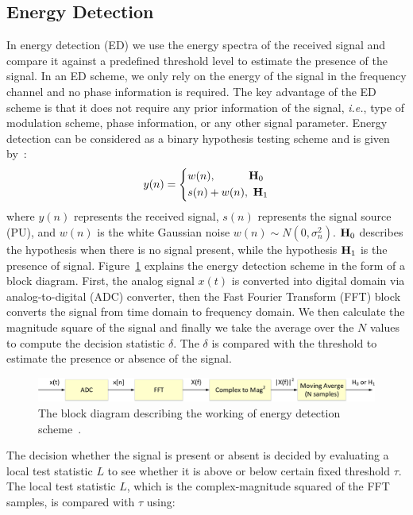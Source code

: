 \subsection{Energy Detection}
In energy detection (ED) we use the energy spectra of the received signal and compare it against a predefined threshold level to estimate the presence of the signal. In an ED scheme, we only rely on the energy of the signal in the frequency channel and no phase information is required. The key advantage of the ED scheme is that it does not require any prior information of the signal, \textit{i.e.}, type of modulation scheme, phase information, or any other signal parameter. Energy detection can be considered as a binary hypothesis testing scheme and is given by~\cite{arhtn4}:
\begin{equation}
	\label{eq:1}
     y(n) = 
     \left\{
     \begin{aligned}
   &w(n),~~~~~~~~~\mathbf{H}_0\\
   &s(n) + w(n),~\mathbf{H}_1
    \end{aligned}
    \right.
\end{equation}
where $y(n)$ represents the received signal, $s(n)$ represents the signal source (PU), and $w(n)$ is the white Gaussian noise $w(n) \sim N(0,\sigma_n^2) $. $\mathbf{H}_0$ describes the hypothesis when there is no signal present, while the hypothesis $\mathbf{H}_1$ is the presence of signal. Figure~\ref{energydet} explains the energy detection scheme in the form of a block diagram. First, the analog signal $x(t)$ is converted into digital domain via analog-to-digital (ADC) converter, then the Fast Fourier Transform (FFT) block converts the signal from time domain to frequency domain. We then calculate the magnitude square of the signal and finally we take the average over the $N$ values to compute the decision statistic $\delta $. The $\delta$ is compared with the threshold to estimate the presence or absence of the signal.

\begin{figure}[ht!]
	\centering
	\includegraphics[width=\textwidth,keepaspectratio]{images/Gill/figs/energydet.eps}
    \caption{The block diagram describing the working of energy detection scheme~\cite{bookhtn1}.} 
\label{energydet}      
\end{figure}


The decision whether the signal is present or absent is decided by evaluating a local test statistic $L$ to see whether it is above or below certain fixed threshold $\tau$. 
The local test statistic $L$, which is the complex-magnitude squared of the FFT samples, is compared with $\tau$ using:

